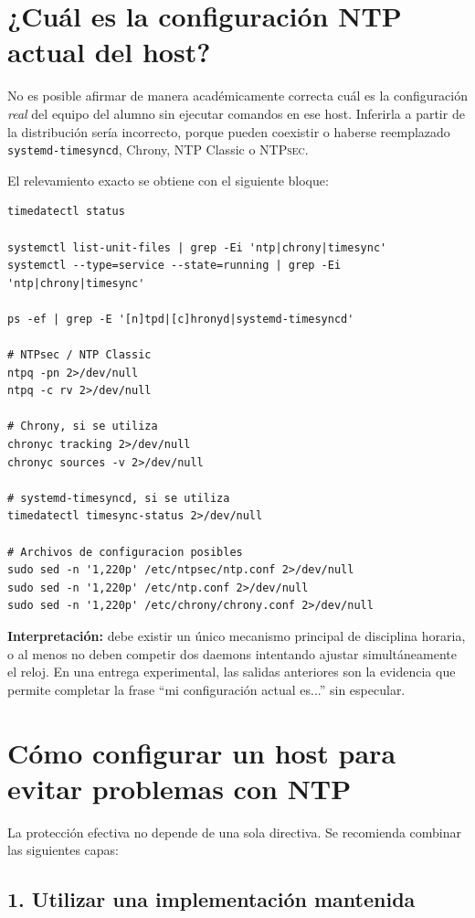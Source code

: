 \documentclass[11pt,a4paper]{article}
\newcommand{\ntpsec}{\textsc{NTPsec}}
\begin{document}
\section{¿Cuál es la configuración NTP actual del host?}

No es posible afirmar de manera académicamente correcta cuál es la configuración \emph{real} del equipo del alumno sin ejecutar comandos en ese host. Inferirla a partir de la distribución sería incorrecto, porque pueden coexistir o haberse reemplazado \texttt{systemd-timesyncd}, Chrony, NTP Classic o \ntpsec{}.

El relevamiento exacto se obtiene con el siguiente bloque:

\begin{lstlisting}[style=terminal]
timedatectl status

systemctl list-unit-files | grep -Ei 'ntp|chrony|timesync'
systemctl --type=service --state=running | grep -Ei 'ntp|chrony|timesync'

ps -ef | grep -E '[n]tpd|[c]hronyd|systemd-timesyncd'

# NTPsec / NTP Classic
ntpq -pn 2>/dev/null
ntpq -c rv 2>/dev/null

# Chrony, si se utiliza
chronyc tracking 2>/dev/null
chronyc sources -v 2>/dev/null

# systemd-timesyncd, si se utiliza
timedatectl timesync-status 2>/dev/null

# Archivos de configuracion posibles
sudo sed -n '1,220p' /etc/ntpsec/ntp.conf 2>/dev/null
sudo sed -n '1,220p' /etc/ntp.conf 2>/dev/null
sudo sed -n '1,220p' /etc/chrony/chrony.conf 2>/dev/null
\end{lstlisting}

\textbf{Interpretación:} debe existir un único mecanismo principal de disciplina horaria, o al menos no deben competir dos daemons intentando ajustar simultáneamente el reloj. En una entrega experimental, las salidas anteriores son la evidencia que permite completar la frase ``mi configuración actual es...'' sin especular.

\section{Cómo configurar un host para evitar problemas con NTP}

La protección efectiva no depende de una sola directiva. Se recomienda combinar las siguientes capas:

\subsection{1. Utilizar una implementación mantenida}
\end{document}
